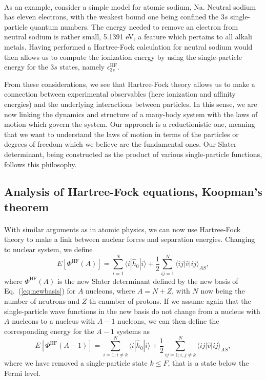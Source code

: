 \documentclass[%
twoside,                 %
final,                   %
10pt]{article}
\begin{document}
\paragraph{}
As an example, consider a simple model for atomic sodium, Na. Neutral sodium has eleven electrons, 
with the weakest bound one being confined the $3s$ single-particle quantum numbers. The energy needed to remove an electron from neutral sodium is rather small, 5.1391 eV, a feature which pertains to all alkali metals.
Having performed a  Hartree-Fock calculation for neutral sodium would then allows us to compute the
ionization energy by using the single-particle energy for the $3s$ states, namely $\epsilon_{3s}^{\mathrm{HF}}$. 

From these considerations, we see that Hartree-Fock theory allows us to make a connection between experimental 
observables (here ionization and affinity energies) and the underlying interactions between particles.  
In this sense, we are now linking the dynamics and structure of a many-body system with the laws of motion which govern the system. Our approach is a reductionistic one, meaning that we want to understand the laws of motion 
in terms of the particles or degrees of freedom which we believe are the fundamental ones. Our Slater determinant, being constructed as the product of various single-particle functions, follows this philosophy.



\subsection*{Analysis of Hartree-Fock equations, Koopman's theorem}

\paragraph{}
With similar arguments as in atomic physics, we can now use Hartree-Fock theory to make a link
between nuclear forces and separation energies. Changing to nuclear system, we define
\[
  E[\Phi^{\mathrm{HF}}(A)] 
  = \sum_{i=1}^N \langle i | \hat{h}_0 | i \rangle +
  \frac{1}{2}\sum_{ij=1}^N\langle ij|\hat{v}|ij\rangle_{AS},
\]
where $\Phi^{\mathrm{HF}}(A)$ is the new Slater determinant defined by the new basis of Eq.~(\ref{eq:newbasis})
for $A$ nucleons, where $A=N+Z$, with $N$ now being the number of neutrons and $Z$ th enumber of protons.  If we assume again that the single-particle wave functions in the new basis do not change from a nucleus with $A$ nucleons to a nucleus with $A-1$  nucleons, we can then define the corresponding energy for the $A-1$ systems as 
\[
  E[\Phi^{\mathrm{HF}}(A-1)] 
  = \sum_{i=1; i\ne k}^N \langle i | \hat{h}_0 | i \rangle +
  \frac{1}{2}\sum_{ij=1;i,j\ne k}^N\langle ij|\hat{v}|ij\rangle_{AS},
\]
where we have removed a single-particle state $k\le F$, that is a state below the Fermi level.
\end{document}
